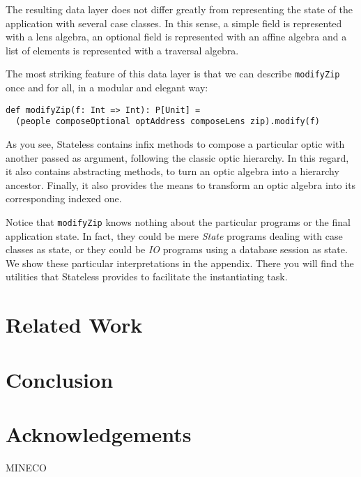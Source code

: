 \documentclass[final, twocolumn, 3p]{elsarticle}
\begin{document}
The resulting data layer does not differ greatly from representing the state of
the application with several case classes. In this sense, a simple field is
represented with a lens algebra, an optional field is represented with an affine
algebra and a list of elements is represented with a traversal algebra.

The most striking feature of this data layer is that we can describe
\lstinline{modifyZip} once and for all, in a modular and elegant way:

\begin{lstlisting}
def modifyZip(f: Int => Int): P[Unit] =
  (people composeOptional optAddress composeLens zip).modify(f)
\end{lstlisting}

As you see, Stateless contains infix methods to compose a particular optic with
another passed as argument, following the classic optic hierarchy. In this
regard, it also contains abstracting methods, to turn an optic algebra into a
hierarchy ancestor. Finally, it also provides the means to transform an optic
algebra into its corresponding indexed one.

Notice that \lstinline{modifyZip} knows nothing about the particular programs or
the final application state. In fact, they could be mere \emph{State} programs
dealing with case classes as state, or they could be \emph{IO} programs using a
database session as state. We show these particular interpretations in the
appendix. There you will find the utilities that Stateless provides to
facilitate the instantiating task.



\section{Related Work}
\label{sec:Discussion}

\section{Conclusion}



\section*{Acknowledgements}
MINECO

{}

\end{document}
